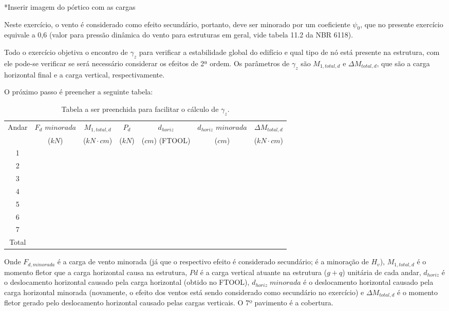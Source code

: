 *Inserir imagem do pórtico com as cargas

Neste exercício, o vento é considerado como efeito secundário, portanto, deve ser minorado por um coeficiente $\psi_0$, que no presente exercício equivale a 0,6 (valor para pressão dinâmica do vento para estruturas em geral, vide tabela 11.2 da NBR 6118).

Todo o exercício objetiva o encontro de $\gamma_z$ para verificar a estabilidade global do edifício e qual tipo de nó está presente na estrutura, com ele pode-se verificar se será necessário considerar os efeitos de 2ª ordem. Os parâmetros de $\gamma_z$ são $M_{1, total, d}$ e $\Delta M_{total, d}$, que são a carga horizontal final e a carga vertical, respectivamente.

O próximo passo é preencher a seguinte tabela:

\begin{table}[H]
\centering
\caption{Tabela a ser preenchida para facilitar o cálculo de $\gamma_z$.}
\label{tab:Tabela-exercicio-vento}
\begin{tabular}{c|c|c|ccc|c}
\hline
Andar & $F_d$ $minorada$ & $M_{1, total, d}$ & \multicolumn{1}{c|}{$P_d$} & \multicolumn{1}{c|}{$d_{horiz}$} & $d_{horiz}$ $minorada$ & $\Delta M_{total, d}$ \\
 & ($kN$) & ($kN\cdot cm$) & \multicolumn{1}{c|}{($kN$)} & \multicolumn{1}{c|}{($cm$) (FTOOL)} & ($cm$) & ($kN\cdot cm$) \\ \hline
1 &  &  & \multicolumn{1}{c|}{} & \multicolumn{1}{c|}{} &  &  \\
2 &  &  & \multicolumn{1}{c|}{} & \multicolumn{1}{c|}{} &  &  \\
3 &  &  & \multicolumn{1}{c|}{} & \multicolumn{1}{c|}{} &  &  \\
4 &  &  & \multicolumn{1}{c|}{} & \multicolumn{1}{c|}{} &  &  \\
5 &  &  & \multicolumn{1}{c|}{} & \multicolumn{1}{c|}{} &  &  \\
6 &  &  & \multicolumn{1}{c|}{} & \multicolumn{1}{c|}{} &  &  \\
7 &  &  & \multicolumn{1}{c|}{} & \multicolumn{1}{c|}{} &  &  \\ \hline
Total &  &  &  &  &  &  \\ \cline{1-1} \cline{3-3} \cline{7-7} 
\end{tabular}
\end{table}

Onde $F_{d, minorada}$ é a carga de vento minorada (já que o respectivo efeito é considerado secundário; é a minoração de $H_v$), $M_{1, total, d}$ é o momento fletor que a carga horizontal causa na estrutura, $Pd$ é a carga vertical atuante na estrutura ($g+q$) unitária de cada andar, $d_{horiz}$ é o deslocamento horizontal causado pela carga horizontal (obtido no FTOOL), $d_{horiz}\;minorada$ é o deslocamento horizontal causado pela carga horizontal minorada (novamente, o efeito dos ventos está sendo considerado como secundário no exercício) e $\Delta M_{total, d}$ é o momento fletor gerado pelo deslocamento horizontal causado pelas cargas verticais. O 7º pavimento é a cobertura.

